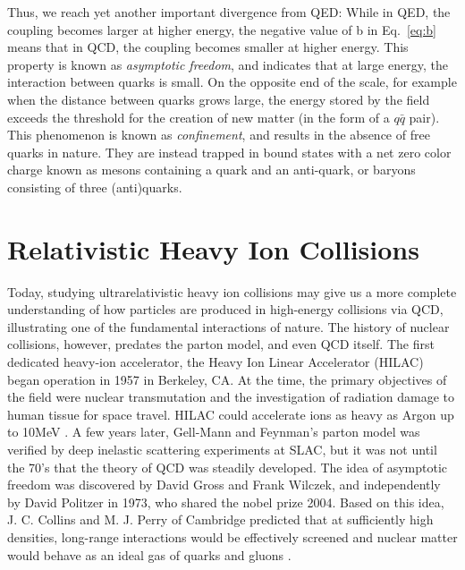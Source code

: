   Thus, we reach yet another important divergence from QED: While in QED, the coupling becomes larger at higher energy, the negative value of b in Eq.~\ref{eq:b} means that in QCD, the coupling becomes smaller at higher energy. This property is known as \textit{asymptotic freedom}, and indicates that at large energy, the interaction between quarks is small. 
  On the opposite end of the scale, for example when the distance between quarks grows large, the energy stored by the field exceeds the threshold for the creation of new matter (in the form of a $q\bar{q}$ pair). This phenomenon is known as \textit{confinement}, and results in the absence of free quarks in nature. They are instead trapped in bound states with a net zero color charge known as mesons containing a quark and an anti-quark, or baryons consisting of three (anti)quarks.

\section{Relativistic Heavy Ion Collisions}\label{sec:rhics}
Today, studying ultrarelativistic heavy ion collisions may give us a more complete understanding of how particles are produced in high-energy collisions via QCD, illustrating one of the fundamental interactions of nature. The history of nuclear collisions, however, predates the parton model, and even QCD itself. The first dedicated heavy-ion accelerator, the Heavy Ion Linear Accelerator (HILAC) began operation in 1957 in Berkeley, CA. At the time, the primary objectives of the field were nuclear transmutation and the investigation of radiation damage to human tissue for space travel. HILAC could accelerate ions as heavy as Argon up to 10MeV \cite{AIP2014}. A few years later, Gell-Mann and Feynman's parton model was verified by deep inelastic scattering experiments at SLAC, but it was not until the 70's that the theory of QCD was steadily developed. The idea of asymptotic freedom was discovered by David Gross and Frank Wilczek, and independently by David Politzer in 1973, who shared the nobel prize 2004. Based on this idea, J. C. Collins and M. J. Perry of Cambridge predicted that at sufficiently high densities, long-range interactions would be effectively screened and nuclear matter would behave as an ideal gas of quarks and gluons \cite{Collins1975}. %

